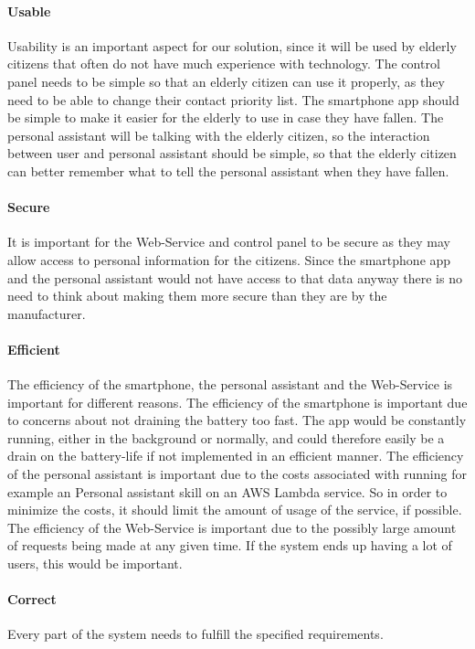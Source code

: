 \paragraph{Usable}
Usability is an important aspect for our solution, since it will be used by elderly citizens that often do not have much experience with technology. The control panel needs to be simple so that an elderly citizen can use it properly, as they need to be able to change their contact priority list. The smartphone app should be simple to make it easier for the elderly to use in case they have fallen. The personal assistant will be talking with the elderly citizen, so the interaction between user and personal assistant should be simple, so that the elderly citizen can better remember what to tell the personal assistant when they have fallen.



\paragraph{Secure}
It is important for the Web-Service and control panel to be secure as they may allow access to personal information for the citizens.
Since the smartphone app and the personal assistant would not have access to that data anyway there is no need to think about making them more secure than they are by the manufacturer.

\paragraph{Efficient}
The efficiency of the smartphone, the personal assistant and the Web-Service is important for different reasons.
The efficiency of the smartphone is important due to concerns about not draining the battery too fast. The app would be constantly running, either in the background or normally, and could therefore easily be a drain on the battery-life if not implemented in an efficient manner.
The efficiency of the personal assistant is important due to the costs associated with running for example an Personal assistant skill on an AWS Lambda service. So in order to minimize the costs, it should limit the amount of usage of the service, if possible.
The efficiency of the Web-Service is important due to the possibly large amount of requests being made at any given time. If the system ends up having a lot of users, this would be important.

\paragraph{Correct}
Every part of the system needs to fulfill the specified requirements.

